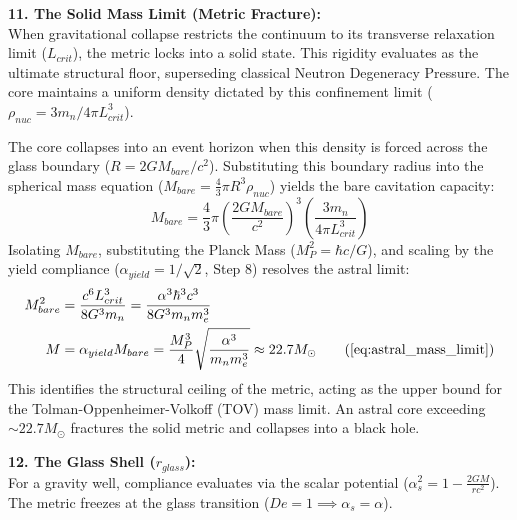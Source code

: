 \vspace{0.2 cm}

\textbf{11. The Solid Mass Limit (Metric Fracture):} \\ 
When gravitational collapse restricts the continuum to its transverse relaxation limit ($L_{crit}$), the metric locks into a solid state. This rigidity evaluates as the ultimate structural floor, superseding classical Neutron Degeneracy Pressure. The core maintains a uniform density dictated by this confinement limit ($\rho_{nuc} = 3 m_n / 4\pi L_{crit}^3$). 

The core collapses into an event horizon when this density is forced across the glass boundary ($R = 2GM_{bare}/c^2$). Substituting this boundary radius into the spherical mass equation ($M_{bare} = \frac{4}{3}\pi R^3 \rho_{nuc}$) yields the bare cavitation capacity: %
\begin{equation}
    M_{bare} = \frac{4}{3}\pi \left( \frac{2GM_{bare}}{c^2} \right)^3 \left( \frac{3 m_n}{4\pi L_{crit}^3} \right) %
\end{equation}
Isolating $M_{bare}$, substituting the Planck Mass ($M_P^2 = \hbar c / G$), and scaling by the yield compliance ($\alpha_{yield} = 1/\sqrt{2}$, Step 8) resolves the astral limit: %
\begin{align}
    M_{bare}^2 &= \frac{c^6 L_{crit}^3}{8 G^3 m_n} = \frac{\alpha^3 \hbar^3 c^3}{8 G^3 m_n m_e^3} \\ %
    M &= \alpha_{yield} M_{bare} = \frac{M_P^3}{4} \sqrt{ \frac{\alpha^3}{m_n m_e^3} } \approx 22.7 M_\odot \tag{\ref{eq:astral_mass_limit}} %
\end{align}
This identifies the structural ceiling of the metric, acting as the upper bound for the Tolman-Oppenheimer-Volkoff (TOV) mass limit. An astral core exceeding $\sim 22.7 M_\odot$ fractures the solid metric and collapses into a black hole. %

\vspace{0.2 cm}

\textbf{12. The Glass Shell ($r_{glass}$):} \\ 
For a gravity well, compliance evaluates via the scalar potential ($\alpha_s^2 = 1 - \frac{2GM}{r c^2}$). The metric freezes at the glass transition ($De = 1 \implies \alpha_s = \alpha$). 

